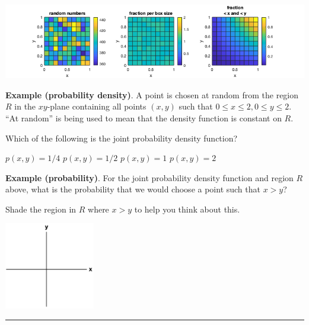 \documentclass[12pt,letterpaper,noanswers]{exam}
\begin{document}

\includegraphics[width=\linewidth]{img/C14simulation.png}



\noindent\textbf{Example (probability density)}.  A point is chosen at random from the region $R$ in the $xy$-plane containing all points $(x,y)$ such that $0\leq x\leq 2, 0\leq y\leq 2$.  ``At random'' is being used to mean that the density function is constant on $R$.  


Which of the following is the joint probability density function?

\begin{oneparcheckboxes}
\choice $p(x,y) = 1/4$
\choice $p(x,y) = 1/2$
\choice $p(x,y) = 1$
\choice $p(x,y) = 2$
\end{oneparcheckboxes}



\vfill

\noindent\textbf{Example (probability)}.  For the joint probability density function and region $R$ above, what is the probability that we would choose a point such that $x > y$?

Shade the region in $R$ where $x>y$ to help you think about this.

\includegraphics[height=1.5in]{img/C02axes-2.png}




\eject

\vspace{0.2cm}
\hrule
\vspace{0.2cm}
\end{document}
